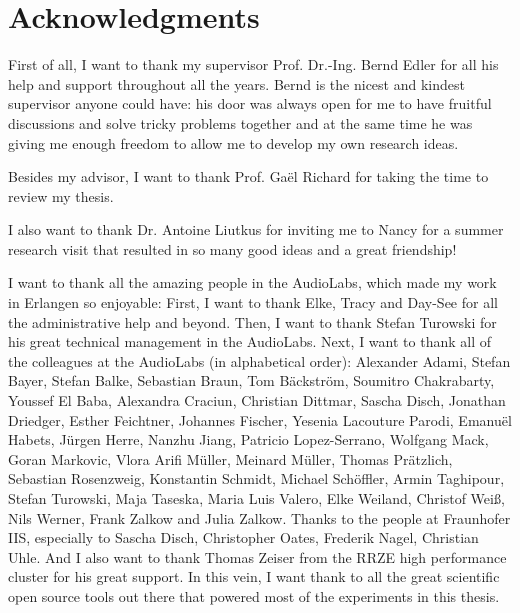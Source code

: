 
\bigskip

\begingroup
\let\clearpage\relax
\let\cleardoublepage\relax
\let\cleardoublepage\relax
\chapter*{Acknowledgments}

First of all, I want to thank my supervisor Prof. Dr.-Ing. Bernd Edler for all his help and support throughout all the years. Bernd is the nicest and kindest supervisor anyone could have: his door was always open for me to have fruitful discussions and solve tricky problems together and at the same time he was giving me enough freedom to allow me to develop my own research ideas.

\bigskip

Besides my advisor, I want to thank Prof. Gaël Richard for taking the time to review my thesis.

\bigskip
I also want to thank Dr. Antoine Liutkus for inviting me to Nancy for a summer research visit that resulted in so many good ideas and a great friendship!

\bigskip

I want to thank all the amazing people in the AudioLabs, which made my work in Erlangen so enjoyable: First, I want to thank Elke, Tracy and Day-See for all the administrative help and beyond. Then, I want to thank Stefan Turowski for his great technical management in the AudioLabs. Next, I want to thank all of the colleagues at the AudioLabs (in alphabetical order): 
Alexander Adami, Stefan Bayer, Stefan Balke, Sebastian Braun, Tom Bäckström, Soumitro Chakrabarty, Youssef El Baba, Alexandra Craciun, Christian Dittmar, Sascha Disch, Jonathan Driedger, Esther Feichtner, Johannes Fischer, Yesenia Lacouture Parodi, Emanuël Habets, Jürgen Herre, Nanzhu Jiang, Patricio Lopez-Serrano, Wolfgang Mack, Goran Markovic, Vlora Arifi Müller, Meinard Müller, Thomas Prätzlich, Sebastian Rosenzweig, Konstantin Schmidt, Michael Schöffler, Armin Taghipour, Stefan Turowski, Maja Taseska, Maria Luis Valero, Elke Weiland, Christof Weiß, Nils Werner, Frank Zalkow and Julia Zalkow. Thanks to the people at Fraunhofer IIS, especially to Sascha Disch, Christopher Oates, Frederik Nagel, Christian Uhle.
And I also want to thank Thomas Zeiser from the RRZE high performance cluster for his great support.
In this vein, I want thank to all the great scientific open source tools out there that powered most of the experiments in this thesis.
\bigskip

